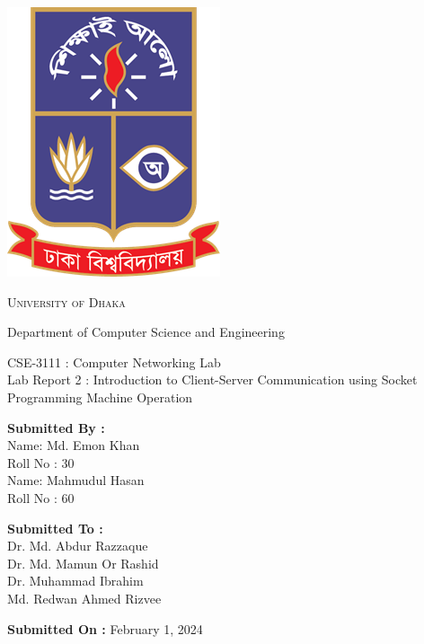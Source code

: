 \documentclass[11pt]{article}
\begin{document}
\begin{titlepage}
    \begin{center}
        \includegraphics[scale=0.35]{du_logo.png}\par
        \begin{Huge}
            \textsc{University of Dhaka}\par
        \end{Huge}
        \begin{Large}
            Department of Computer Science and Engineering\par \vspace{1cm}
            CSE-3111 : Computer Networking Lab \\[12pt]    
            Lab Report 2 : Introduction to Client-Server Communication using Socket Programming Machine Operation
        \end{Large}
    \end{center}
    
    \vfill
    
    \begin{large}
        \begin{multicols}{2}
            \noindent
            \textbf{Submitted By :\\[12pt]}
                Name: Md. Emon Khan\\[8pt]
                Roll No : 30\\[12pt]
                Name: Mahmudul Hasan\\[8pt]
                Roll No : 60\\[12pt]
                
            \columnbreak
            
            \noindent
            \textbf{Submitted To :\\[12pt]}
                Dr. Md. Abdur Razzaque\\[12pt]
                Dr. Md. Mamun Or Rashid\\[12pt]
                Dr. Muhammad Ibrahim\\[12pt]
                Md. Redwan Ahmed Rizvee
        \end{multicols}    
    \end{large} 
    
\textbf{Submitted On :} February 1, 2024\\[20pt]

\end{titlepage}
\end{document}
